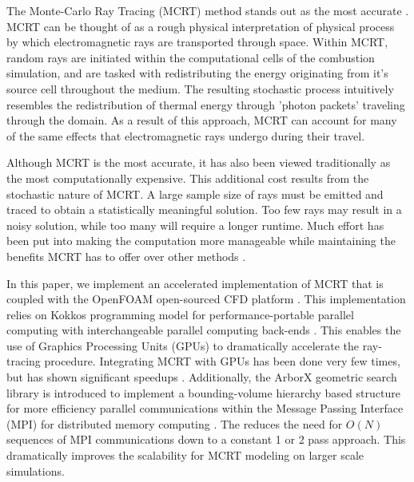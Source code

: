The Monte-Carlo Ray Tracing (MCRT) method stands out as the most accurate \cite{Tesse2002RadiativeApproach,Modest2013RadiativeTransfer,Coelho2018RadiativeSystems}. 
MCRT can be thought of as a rough physical interpretation of physical process by which electromagnetic rays are transported through space.
Within MCRT, random rays are initiated within the computational cells of the combustion simulation, and are tasked with redistributing the energy originating from it's source cell throughout the medium. The resulting stochastic process intuitively resembles the redistribution of thermal energy through 'photon packets' traveling through the domain.
As a result of this approach, MCRT can account for many of the same effects that electromagnetic rays undergo during their travel.

Although MCRT is the most accurate, it has also been viewed traditionally as the most computationally expensive.
This additional cost results from the stochastic nature of MCRT. A large sample size of rays must be emitted and traced to obtain a statistically meaningful solution. 
Too few rays may result in a noisy solution, while too many will require a longer runtime.
Much effort has been put into making the computation more manageable while maintaining the benefits MCRT has to offer over other methods \cite{Liu2020TheFlames,Tesse2002RadiativeApproach,Zeeb2001AnGeometries,Modest2003BackwardTransfer,Howell2010ThermalTransfer}.

In this paper, we implement an accelerated implementation of MCRT that is coupled with the OpenFOAM open-sourced CFD platform \cite{Weller1998ATechniques}. 
This implementation relies on Kokkos programming model for performance-portable parallel computing with interchangeable parallel computing back-ends \cite{Trott2021KokkosEra}. This enables the use of Graphics Processing Units (GPUs) to dramatically accelerate the ray-tracing procedure. Integrating MCRT with GPUs has been done very few times, but has shown significant speedups \cite{Silvestri2019ASimulation,Humphrey2016RadiativeRefinement,Heymann2012GPU-basedAGN}. 
Additionally, the ArborX geometric search library is introduced to implement a bounding-volume hierarchy based structure for more efficiency parallel communications within the Message Passing Interface (MPI) for distributed memory computing \cite{Lebrun-Grandie2019ArborX:Library}. 
The  reduces the need for $O(N)$ sequences of MPI communications down to a constant 1 or 2 pass approach. This dramatically improves the scalability for MCRT modeling on larger scale simulations. 

